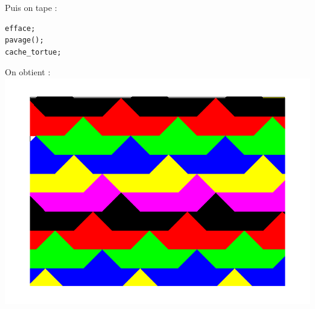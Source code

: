 \documentclass[a4paper,11pt]{book}
\begin{document}
Puis on tape :
\begin{verbatim}
efface;
pavage();
cache_tortue;
\end{verbatim}
On obtient :\\
\includegraphics[width=\textwidth]{tortpav}
\end{document}
